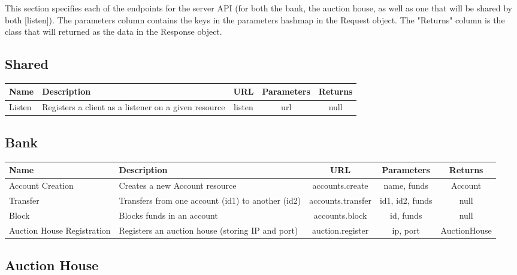 \documentclass{article}
\begin{document}
This section specifies each of the endpoints for the server API (for both the bank, the auction house, as well
as one that will be shared by both [listen]). The parameters column contains the keys in the parameters hashmap
in the Request object. The "Returns" column is the class that will returned as the data in the Response object.

\subsection{Shared}

\begin{center}
\begin{tabular}{|| m{5 em} | m{15 em} | c | c | c ||}
    \hline
    Name & Description & URL & Parameters & Returns \\
    \hline
    \hline
    Listen & Registers a client as a listener on a given resource & listen & url & null \\
    \hline
\end{tabular}
\end{center}

\subsection{Bank}

\begin{center}
\begin{tabular}{|| m{5 em} | m{15 em} | c | c | c ||}
    \hline
    Name & Description & URL & Parameters & Returns \\
    \hline
    \hline
    Account Creation & Creates a new Account resource & accounts.create & name, funds & Account \\
    \hline
    Transfer & Transfers from one account (id1) to another (id2) & accounts.transfer & id1, id2, funds & null \\
    \hline
    Block & Blocks funds in an account & accounts.block & id, funds & null \\
    \hline
    Auction House Registration & Registers an auction house (storing IP and port) & auction.register & ip, port & AuctionHouse \\
    \hline
\end{tabular}
\end{center}

\subsection{Auction House}
\end{document}
